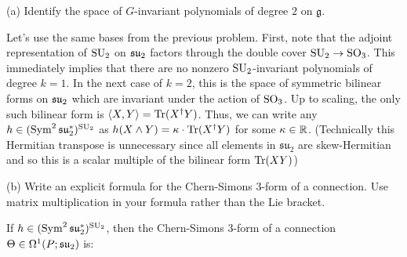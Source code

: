 \documentclass{../../templates/lkx_pset}
\begin{document}
\begin{parts}
	\begin{part}{(a)}
		Identify the space of $G$-invariant polynomials of degree $2$ on $\mathfrak{g}$.
	\end{part}

	Let's use the same bases from the previous problem. First, note that the adjoint representation of $\operatorname{SU}_2$ on $\mathfrak{su}_2$ factors through the double cover $\operatorname{SU}_2 \to \operatorname{SO}_3$.
	This immediately implies that there are no nonzero $\operatorname{SU}_2$-invariant polynomials of degree $k=1$. In the next case of $k=2$, this is the space of symmetric bilinear forms on $\mathfrak{su}_2$ which are invariant under the action of $\operatorname{SO}_3$.
	Up to scaling, the only such bilinear form is $\langle X, Y\rangle = \operatorname{Tr}(X^\dagger Y)$. Thus, we can write any $h\in (\operatorname{Sym}^2\mathfrak{su}_2^*)^{\operatorname{SU}_2}$ as $h(X\wedge Y) = \kappa\cdot \operatorname{Tr}(X^\dagger Y)$ for some $\kappa\in \mathbb{R}$. (Technically this Hermitian transpose is unnecessary since all elements in $\mathfrak{su}_2$ are skew-Hermitian and so this is a scalar multiple of the bilinear form $\operatorname{Tr}(XY)$)

	\begin{part}{(b)}
		Write an explicit formula for the Chern-Simons $3$-form of a connection. Use matrix multiplication in your formula rather than the Lie bracket.
	\end{part}

	If $h\in (\operatorname{Sym}^2\mathfrak{su}_2^*)^{\operatorname{SU}_2}$, then the Chern-Simons $3$-form of a connection $\Theta\in \Omega^1(P; \mathfrak{su}_2)$ is:


\end{parts}
\end{document}
